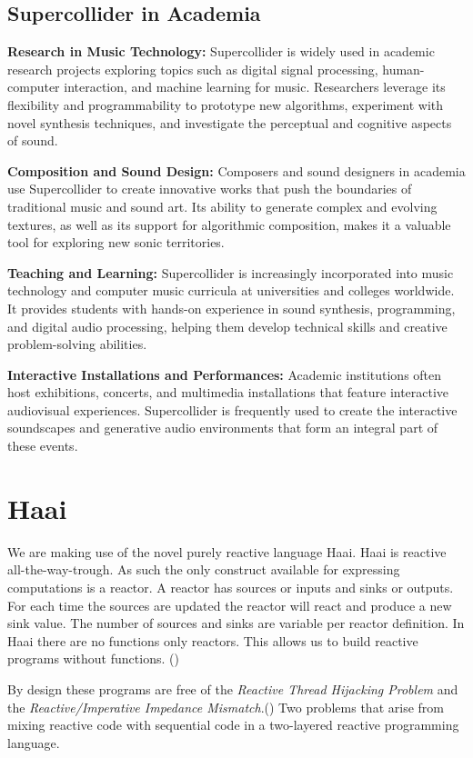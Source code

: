 \documentclass[a4paper]{book}
\begin{document}
\section{Supercollider in Academia}

\textbf{Research in Music Technology:} Supercollider is widely used in academic research projects exploring topics such as digital signal processing, human-computer interaction, and machine learning for music. Researchers leverage its flexibility and programmability to prototype new algorithms, experiment with novel synthesis techniques, and investigate the perceptual and cognitive aspects of sound.

\textbf{Composition and Sound Design:} Composers and sound designers in academia use Supercollider to create innovative works that push the boundaries of traditional music and sound art. Its ability to generate complex and evolving textures, as well as its support for algorithmic composition, makes it a valuable tool for exploring new sonic territories.

\textbf{Teaching and Learning:} Supercollider is increasingly incorporated into music technology and computer music curricula at universities and colleges worldwide. It provides students with hands-on experience in sound synthesis, programming, and digital audio processing, helping them develop technical skills and creative problem-solving abilities.

\textbf{Interactive Installations and Performances:} Academic institutions often host exhibitions, concerts, and multimedia installations that feature interactive audiovisual experiences. Supercollider is frequently used to create the interactive soundscapes and generative audio environments that form an integral part of these events.
\chapter{Haai}
We are making use of the novel purely reactive language Haai. Haai is reactive all-the-way-trough. As such the only construct available for expressing computations is a reactor. A reactor has sources or inputs and sinks or outputs. For each time the sources are updated the reactor will react and produce a new sink value. The number of sources and sinks are variable per reactor definition. In Haai there are no functions only reactors. This allows us to build reactive programs without functions. (\cite{oeyen_reactive_2024})

By design these programs are free of the \textit{Reactive Thread Hijacking Problem} and the \textit{Reactive/Imperative Impedance Mismatch}.(\cite{vonder_tackling_2020}) Two problems that arise from mixing reactive code with sequential code in a two-layered reactive programming language. 
\end{document}

